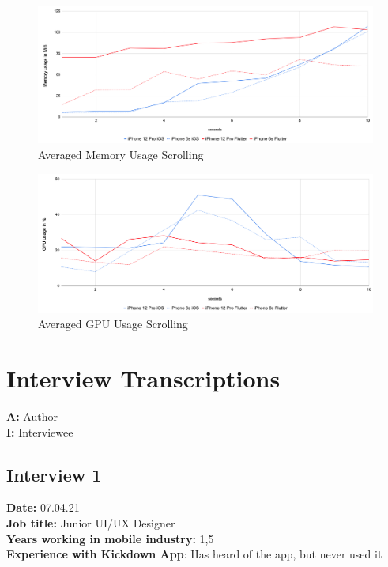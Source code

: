 \begin{figure}[!htbp]
    \centering
    \includegraphics[width=\linewidth]{images/performance_results/image_gallery/avg_memory_usage_image_gallery.png}
    \caption{Averaged Memory Usage Scrolling}
    \label{fig:avg_memory_usage_scrolling}
\end{figure}

\begin{figure}[!htbp]
    \centering
    \includegraphics[width=\linewidth]{images/performance_results/image_gallery/avg_gpu_usage_image_gallery.png}
    \caption{Averaged GPU Usage Scrolling}
    \label{fig:avg_gpu_usage_scrolling}
\end{figure}
\FloatBarrier

\chapter{Interview Transcriptions} \label{section::interview::transcriptions}

\textbf{A:} Author\\
\textbf{I:} Interviewee

\section{Interview 1}
\textbf{Date:} 07.04.21\\
\textbf{Job title:} Junior UI/UX Designer\\
\textbf{Years working in mobile industry:} 1,5\\
\textbf{Experience with Kickdown App}: Has heard of the app, but never used it\\

